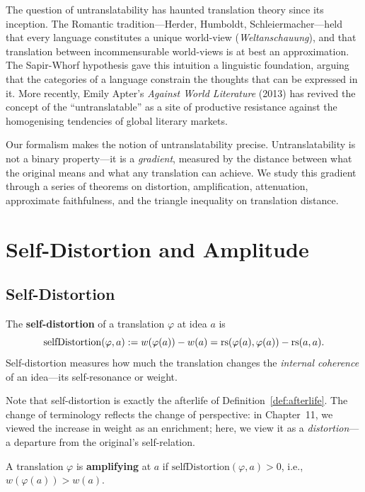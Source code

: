 The question of untranslatability has haunted translation theory since its
inception.  The Romantic tradition---Herder, Humboldt, Schleiermacher---held
that every language constitutes a unique world-view (\emph{Weltanschauung}),
and that translation between incommensurable world-views is at best an
approximation.  The Sapir-Whorf hypothesis gave this intuition a linguistic
foundation, arguing that the categories of a language constrain the thoughts
that can be expressed in it.  More recently, Emily Apter's \emph{Against
World Literature} (2013) has revived the concept of the ``untranslatable''
as a site of productive resistance against the homogenising tendencies of
global literary markets.

Our formalism makes the notion of untranslatability precise.  Untranslatability
is not a binary property---it is a \emph{gradient}, measured by the distance
between what the original means and what any translation can achieve.  We
study this gradient through a series of theorems on distortion, amplification,
attenuation, approximate faithfulness, and the triangle inequality on
translation distance.

\section{Self-Distortion and Amplitude}
\label{sec:untranslatable:distortion}

\subsection{Self-Distortion}

\begin{definition}
\label{def:self-distortion}
The \textbf{self-distortion} of a translation $\varphi$ at idea $a$ is
\[
  \mathrm{selfDistortion}(\varphi, a) := w(\varphi(a)) - w(a)
    = \mathrm{rs}(\varphi(a), \varphi(a)) - \mathrm{rs}(a, a).
\]
Self-distortion measures how much the translation changes the
\emph{internal coherence} of an idea---its self-resonance or weight.
\end{definition}

Note that self-distortion is exactly the afterlife of
Definition~\ref{def:afterlife}.  The change of terminology reflects the
change of perspective: in Chapter~11, we viewed the increase in weight
as an enrichment; here, we view it as a \emph{distortion}---a departure
from the original's self-relation.

\begin{definition}
\label{def:amplifying}
A translation $\varphi$ is \textbf{amplifying} at $a$ if
$\mathrm{selfDistortion}(\varphi, a) > 0$, i.e., $w(\varphi(a)) > w(a)$.
\end{definition}

